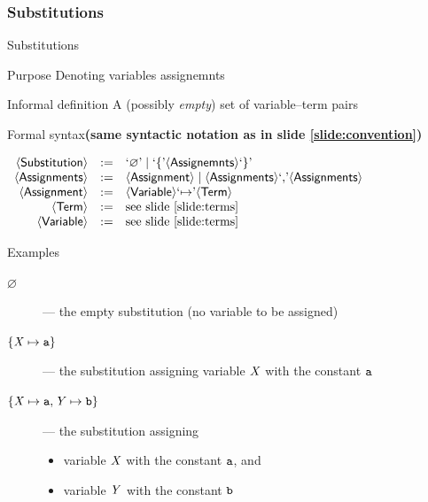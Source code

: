 \documentclass[presentation]{beamer}\mode<presentation>{\usetheme{AMSBolognaFC}}
\begin{document}
\subsubsection{Substitutions}

\begin{frame}[allowframebreaks]{Substitutions}
    \begin{block}{Purpose}\centering
        Denoting variables assignemnts
    \end{block}
    \begin{block}{Informal definition}
        A (possibly \emph{empty}) set of \alert{variable--term} pairs
    \end{block}
    \begin{alertblock}{Formal syntax\hfill\textbf{\footnotesize(same syntactic notation as in slide \ref{slide:convention})}}
        \begin{center}
            $\begin{array}{rcl}
                \mathsf{\left\langle Substitution\right\rangle} & := & \text{`}\mathit{\varnothing}\text{'} \mid \text{`}\mathit{\{}\text{'} \mathsf{\left\langle Assignemnts\right\rangle} \text{`}\mathit{\}}\text{'}
                \\
                \mathsf{\left\langle Assignments\right\rangle} & := & \mathsf{\left\langle Assignment\right\rangle} \mid \mathsf{\left\langle Assignments\right\rangle} \text{`}\mathit{,}\text{'} \mathsf{\left\langle Assignments\right\rangle}
                \\
                \mathsf{\left\langle Assignment\right\rangle} & := & \mathsf{\left\langle Variable\right\rangle} \text{`}\mathit{\mapsto}\text{'} \mathsf{\left\langle Term\right\rangle}
                \\
                \mathsf{\left\langle Term\right\rangle} & := & \text{see slide \ref{slide:terms}}
                \\
                \mathsf{\left\langle Variable\right\rangle} & := & \text{see slide \ref{slide:terms}}
            \end{array}$
        \end{center}
    \end{alertblock}

    \begin{exampleblock}{Examples}
        \begin{description}
            \item[$\varnothing$] --- the empty substitution (no variable to be assigned)
            \item[$\{ \mathit{X} \mapsto \mathtt{a} \}$] --- the substitution assigning variable $\mathit{X}$ with the constant $\mathtt{a}$
            \item[$\{ \mathit{X} \mapsto \mathtt{a}, \mathit{Y} \mapsto \mathtt{b} \}$] --- the substitution assigning 
            \begin{itemize}
                \item variable $\mathit{X}$ with the constant $\mathtt{a}$, and
                \item variable $\mathit{Y}$ with the constant $\mathtt{b}$ 
            \end{itemize} 
        \end{description}
    \end{exampleblock}
\end{frame}
\end{document}
